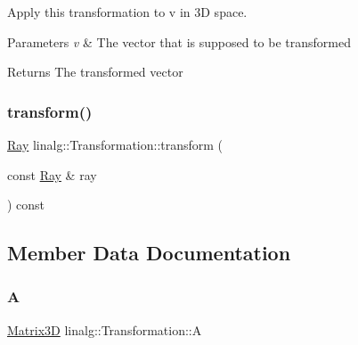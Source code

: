 Apply this transformation to v in 3D space. 


\begin{DoxyParams}{Parameters}
{\em v} & The vector that is supposed to be transformed \\
\hline
\end{DoxyParams}
\begin{DoxyReturn}{Returns}
The transformed vector 
\end{DoxyReturn}
\mbox{\label{classlinalg_1_1Transformation_a2f0c817ed97307ec777f46a37810421e}} 
\subsubsection{\texorpdfstring{transform()}{transform()}\hspace{0.1cm}{\footnotesize\ttfamily [2/2]}}
{\footnotesize\ttfamily \mbox{\hyperlink{classRay}{Ray}} linalg\+::\+Transformation\+::transform (\begin{DoxyParamCaption}\item[{const \mbox{\hyperlink{classRay}{Ray}} \&}]{ray }\end{DoxyParamCaption}) const}



\subsection{Member Data Documentation}
\mbox{\label{classlinalg_1_1Transformation_a24a75d79007bc9b5c5f32c042fb4332b}} 
\subsubsection{\texorpdfstring{A}{A}}
{\footnotesize\ttfamily \mbox{\hyperlink{classlinalg_1_1Matrix3D}{Matrix3D}} linalg\+::\+Transformation\+::A\hspace{0.3cm}{\ttfamily [private]}}

\mbox{\label{classlinalg_1_1Transformation_ac720d71bf88660e2ae3f3d776c7cfd01}} 
